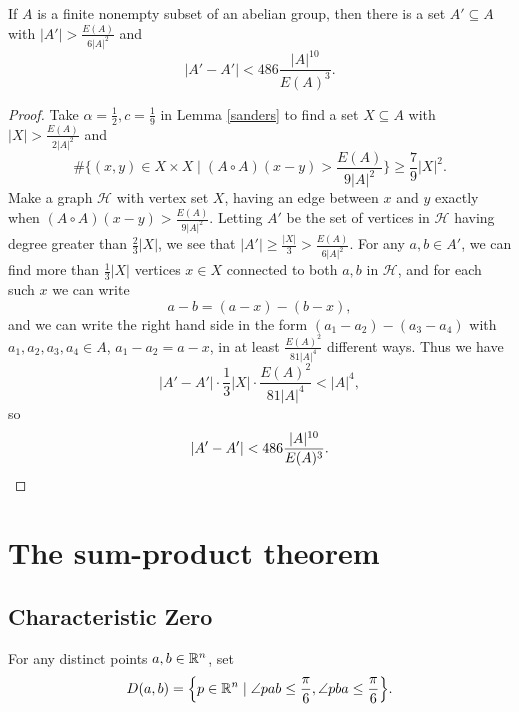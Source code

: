 \begin{thm} If $A$ is a finite nonempty subset of an abelian group, then there is a set $A' \subseteq A$ with $|A'| > \frac{E(A)}{6|A|^2}$ and
\[
|A'-A'| < 486\frac{|A|^{10}}{E(A)^3}.
\]
\end{thm}
\begin{proof} Take $\alpha = \frac{1}{2}, c = \frac{1}{9}$ in Lemma \ref{sanders} to find a set $X\subseteq A$ with $|X| > \frac{E(A)}{2|A|^2}$ and
\[
\#\bigg\{(x,y)\in X\times X \mid (A\circ A)(x-y) > \frac{E(A)}{9|A|^2}\bigg\} \ge \frac{7}{9}|X|^2.
\]
Make a graph $\mathcal{H}$ with vertex set $X$, having an edge between $x$ and $y$ exactly when $(A\circ A)(x-y) > \frac{E(A)}{9|A|^2}$. Letting $A'$ be the set of vertices in $\mathcal{H}$ having degree greater than $\frac{2}{3}|X|$, we see that $|A'| \ge \frac{|X|}{3} > \frac{E(A)}{6|A|^2}$. For any $a,b \in A'$, we can find more than $\frac{1}{3}|X|$ vertices $x \in X$ connected to both $a,b$ in $\mathcal{H}$, and for each such $x$ we can write
\[
a-b = (a-x) - (b-x),
\]
and we can write the right hand side in the form $(a_1-a_2) - (a_3-a_4)$ with $a_1, a_2, a_3, a_4 \in A$, $a_1-a_2 = a-x$, in at least $\frac{E(A)^2}{81|A|^4}$ different ways. Thus we have
\[
|A'-A'|\cdot \frac{1}{3}|X|\cdot \frac{E(A)^2}{81|A|^4} < |A|^4,
\]
so
\[
|A'-A'| < 486\frac{|A|^{10}}{E(A)^3}.\qedhere
\]
\end{proof}


\section{The sum-product theorem}

\subsection{Characteristic Zero}

\begin{defn} For any distinct points $a,b\in \mathbb{R}^n$, set
\[
D(a,b) = \Big\{p \in \mathbb{R}^n \mid \angle pab \le \frac{\pi}{6}, \angle pba \le \frac{\pi}{6}\Big\}.
\]
\end{defn}

